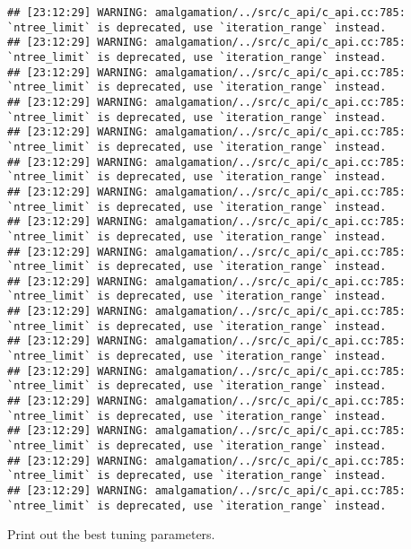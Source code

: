 \documentclass[
]{article}
\newenvironment{Shaded}{\begin{snugshade}}{\end{snugshade}}
\newcommand{\NormalTok}[1]{#1}
\newcommand{\SpecialCharTok}[1]{\textcolor[rgb]{0.00,0.00,0.00}{#1}}
\begin{document}
\begin{verbatim}
## [23:12:29] WARNING: amalgamation/../src/c_api/c_api.cc:785: `ntree_limit` is deprecated, use `iteration_range` instead.
## [23:12:29] WARNING: amalgamation/../src/c_api/c_api.cc:785: `ntree_limit` is deprecated, use `iteration_range` instead.
## [23:12:29] WARNING: amalgamation/../src/c_api/c_api.cc:785: `ntree_limit` is deprecated, use `iteration_range` instead.
## [23:12:29] WARNING: amalgamation/../src/c_api/c_api.cc:785: `ntree_limit` is deprecated, use `iteration_range` instead.
## [23:12:29] WARNING: amalgamation/../src/c_api/c_api.cc:785: `ntree_limit` is deprecated, use `iteration_range` instead.
## [23:12:29] WARNING: amalgamation/../src/c_api/c_api.cc:785: `ntree_limit` is deprecated, use `iteration_range` instead.
## [23:12:29] WARNING: amalgamation/../src/c_api/c_api.cc:785: `ntree_limit` is deprecated, use `iteration_range` instead.
## [23:12:29] WARNING: amalgamation/../src/c_api/c_api.cc:785: `ntree_limit` is deprecated, use `iteration_range` instead.
## [23:12:29] WARNING: amalgamation/../src/c_api/c_api.cc:785: `ntree_limit` is deprecated, use `iteration_range` instead.
## [23:12:29] WARNING: amalgamation/../src/c_api/c_api.cc:785: `ntree_limit` is deprecated, use `iteration_range` instead.
## [23:12:29] WARNING: amalgamation/../src/c_api/c_api.cc:785: `ntree_limit` is deprecated, use `iteration_range` instead.
## [23:12:29] WARNING: amalgamation/../src/c_api/c_api.cc:785: `ntree_limit` is deprecated, use `iteration_range` instead.
## [23:12:29] WARNING: amalgamation/../src/c_api/c_api.cc:785: `ntree_limit` is deprecated, use `iteration_range` instead.
## [23:12:29] WARNING: amalgamation/../src/c_api/c_api.cc:785: `ntree_limit` is deprecated, use `iteration_range` instead.
## [23:12:29] WARNING: amalgamation/../src/c_api/c_api.cc:785: `ntree_limit` is deprecated, use `iteration_range` instead.
## [23:12:29] WARNING: amalgamation/../src/c_api/c_api.cc:785: `ntree_limit` is deprecated, use `iteration_range` instead.
## [23:12:29] WARNING: amalgamation/../src/c_api/c_api.cc:785: `ntree_limit` is deprecated, use `iteration_range` instead.
\end{verbatim}

Print out the best tuning parameters.

\begin{Shaded}
\end{Shaded}
\end{document}
